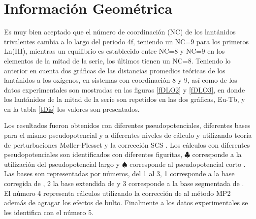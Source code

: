 \section{Informaci\'on Geom\'etrica}
Es muy bien aceptado que el n\'umero de
coordinaci\'on (NC) de los lant\'anidos trivalentes cambia a lo largo
del periodo 4f, teniendo un NC=9 para los primeros Ln(III), mientras
un equilibrio es establecido entre NC=8 y NC=9 en los elementos de la
mitad de la serie, los \'ultimos tienen un NC=8. Teniendo lo anterior
en cuenta dos gr\'aficas de las distancias promedios te\'oricas de 
los lant\'anidos a los ox\'igenos, en sistemas con coordinaci\'on 8 y 
9, as\'i como de los datos experimentales son mostradas en las figuras 
\ref{fDLO2} y \ref{fDLO3}, en donde los lant\'anidos de la mitad de la
serie son repetidos en las dos gr\'aficas, Eu-Tb, y en la tabla 
\ref{tDis} los valores son presentados. 

Los resultados fueron 
obtenidos con diferentes pseudopotenciales, diferentes bases para el
mismo pseudopotencial y a diferentes niveles de c\'alculo y utilizando
teor\'ia de perturbaciones M\o ller-Plesset y la correcci\'on SCS 
\citep{Grim2003}. Los c\'alculos con diferentes pseudopotenciales son
identificados con diferentes figuritas, $\clubsuit$ corresponde a la
utilizaci\'on del pseudopotencial largo \citep{Dolg1989} y 
$\spadesuit$ corresponde al pseudopotencial corto \citep{Cao2001}. 
Las bases son representadas por n\'umeros, del 1 al 3, 1 corresponde 
a la base corregida de \cite{Dolg1993}, 2 la base extendida de 
\cite{Yang2005} y 3 corresponde a la base segmentada de 
\cite{Cao2002}. El n\'umero 4 representa c\'alculos utilizando la
correcci\'on de \cite{Grim2003} al m\'etodo MP2 adem\'as de agragar
los efectos de bulto. Finalmente a los datos experimentales se les
identifica con el n\'umero 5.

